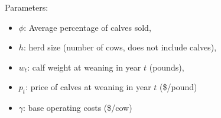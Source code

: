 \documentclass[11pt]{amsart}
\begin{document}
Parameters:
\begin{itemize}
\item \(\phi\): Average percentage of calves sold, 
\item \(h\): herd size (number of cows, does not include calves), 
\item $w_t$: calf weight at weaning in year \(t\) (pounds), 
\item $p_t$: price of calves at weaning in year \(t\) (\$/pound)
\item \(\gamma\): base operating costs (\$/cow)
\end{itemize}
\end{document}
